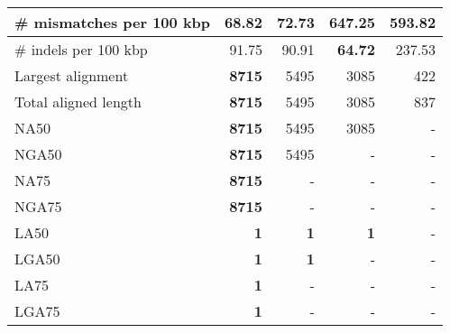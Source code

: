\documentclass[12pt,a4paper]{article}
\begin{document}
\begin{table}[ht]
\begin{center}
\begin{tabular}{|l*{4}{|r}|}
\# mismatches per 100 kbp & {\bf 68.82} & 72.73 & 647.25 & 593.82 \\ \hline
\# indels per 100 kbp & 91.75 & 90.91 & {\bf 64.72} & 237.53 \\ \hline
Largest alignment & {\bf 8715} & 5495 & 3085 & 422 \\ \hline
Total aligned length & {\bf 8715} & 5495 & 3085 & 837 \\ \hline
NA50 & {\bf 8715} & 5495 & 3085 & - \\ \hline
NGA50 & {\bf 8715} & 5495 & - & - \\ \hline
NA75 & {\bf 8715} & - & - & - \\ \hline
NGA75 & {\bf 8715} & - & - & - \\ \hline
LA50 & {\bf 1} & {\bf 1} & {\bf 1} & - \\ \hline
LGA50 & {\bf 1} & {\bf 1} & - & - \\ \hline
LA75 & {\bf 1} & - & - & - \\ \hline
LGA75 & {\bf 1} & - & - & - \\ \hline
\end{tabular}
\end{center}
\end{table}
\end{document}
